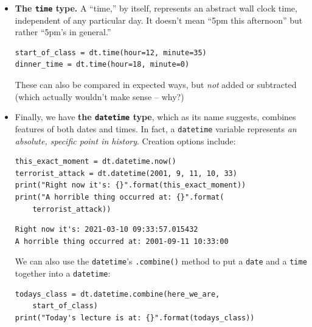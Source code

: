 \begin{itemize}

\item \textbf{The \texttt{time} type.} A ``time,'' by itself, represents an
abstract wall clock time, independent of any particular day. It doesn't mean
``5pm this afternoon'' but rather ``5pm's in general.''

\begin{Verbatim}[fontsize=\small,samepage=true,frame=single,framesep=3mm]
start_of_class = dt.time(hour=12, minute=35)
dinner_time = dt.time(hour=18, minute=0)
\end{Verbatim}

These can also be compared in expected ways, but \textit{not} added or
subtracted (which actually wouldn't make sense -- why?)


\item Finally, we have \textbf{the \texttt{datetime} type}, which as its name
suggests, combines features of both dates and times. In fact, a
\texttt{datetime} variable represents \textit{an absolute, specific point in
history}. Creation options include:

\begin{Verbatim}[fontsize=\footnotesize,samepage=true,frame=single,framesep=3mm]
this_exact_moment = dt.datetime.now()
terrorist_attack = dt.datetime(2001, 9, 11, 10, 33)
print("Right now it's: {}".format(this_exact_moment))
print("A horrible thing occurred at: {}".format(
    terrorist_attack))
\end{Verbatim}
\vspace{-.2in}

\begin{Verbatim}[fontsize=\footnotesize,samepage=true,frame=leftline,framesep=5mm,framerule=1mm]
Right now it's: 2021-03-10 09:33:57.015432
A horrible thing occurred at: 2001-09-11 10:33:00
\end{Verbatim}


We can also use the \texttt{datetime}'s \texttt{.combine()} method to put a
\texttt{date} and a \texttt{time} together into a \texttt{datetime}:

\begin{Verbatim}[fontsize=\footnotesize,samepage=true,frame=single,framesep=3mm]
todays_class = dt.datetime.combine(here_we_are,
    start_of_class)
print("Today's lecture is at: {}".format(todays_class))
\end{Verbatim}
\vspace{-.2in}


\end{itemize}
